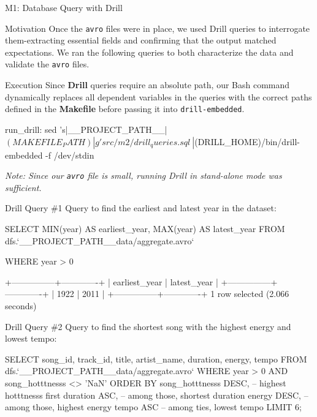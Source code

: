 \documentclass{beamer}
\begin{document}
\begin{section}{M1: Database Query with Drill}
    \begin{frame}{Motivation}
Once the \texttt{avro} files were in place, we used Drill queries to interrogate them-extracting essential fields and confirming that the output matched expectations. We ran the following queries to both characterize the data and validate the \texttt{avro} files.

    \end{frame}

    \begin{frame}[fragile]{Execution}
  Since \textbf{Drill} queries require an absolute path, our Bash command dynamically replaces all dependent variables in the queries with the correct paths defined in the \textbf{Makefile} before passing it into \texttt{drill-embedded}.
    
    \begin{bashcode}
run_drill:
    sed 's|__PROJECT_PATH__|$(MAKEFILE_PATH)|g' src/m2/drill_queries.sql \
    | $(DRILL_HOME)/bin/drill-embedded -f /dev/stdin
    \end{bashcode}

\textit{Note: Since our \texttt{avro} file is small, running Drill in stand-alone mode was sufficient.}
    \end{frame}

    
    
    \begin{frame}[fragile]{Drill Query \#1}
    Query to find the earliest and latest year in the dataset:

    \begin{mycodesql}
SELECT
  MIN(year) AS earliest_year,
  MAX(year) AS latest_year
FROM dfs.`__PROJECT_PATH__data/aggregate.avro`

WHERE year > 0
    \end{mycodesql}

    \begin{bashcode}
+---------------+-------------+
| earliest_year | latest_year |
+---------------+-------------+
| 1922          | 2011        |
+---------------+-------------+
1 row selected (2.066 seconds)
    \end{bashcode}
    
    \end{frame}
    \begin{frame}[fragile]{Drill Query \#2}
    Query to find the shortest song with the highest energy and lowest tempo:
\begin{mycodesql}
SELECT
  song_id,
  track_id,
  title,
  artist_name,
  duration,
  energy,
  tempo
FROM dfs.`__PROJECT_PATH__data/aggregate.avro`
WHERE year > 0 AND song_hotttnesss <> 'NaN'
ORDER BY
  song_hotttnesss DESC, -- highest hotttnesss first
  duration    ASC,   -- among those, shortest duration
  energy      DESC,  -- among those, highest energy
  tempo       ASC    -- among ties, lowest tempo
LIMIT 6;
\end{mycodesql}


\end{frame}
\end{section}
\end{document}
